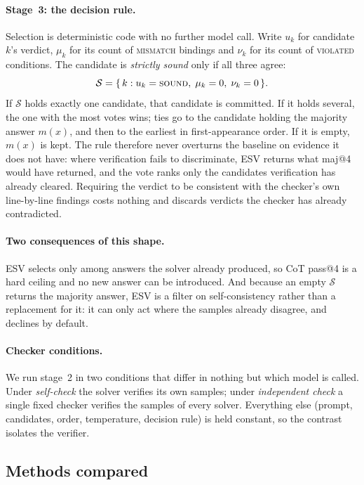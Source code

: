 \documentclass[letterpaper]{article} %
\newcommand{\method}{\textsc{ESV}}   %
\begin{document}
\paragraph{Stage~3: the decision rule.}
Selection is deterministic code with no further model call. Write $u_k$ for
candidate $k$'s verdict, $\mu_k$ for its count of \textsc{mismatch} bindings
and $\nu_k$ for its count of \textsc{violated} conditions. The candidate is
\emph{strictly sound} only if all three agree:
\begin{equation}
  \mathcal{S} = \{\, k : u_k = \textsc{sound},\; \mu_k = 0,\; \nu_k = 0 \,\}.
  \label{eq:strict}
\end{equation}
If $\mathcal{S}$ holds exactly one candidate, that candidate is committed. If it
holds several, the one with the most votes wins; ties go to the candidate
holding the majority answer $m(x)$, and then to the earliest in first-appearance
order. If it is empty, $m(x)$ is kept. The rule therefore never overturns the
baseline on evidence it does not have: where verification fails to discriminate,
\method{} returns what maj@4 would have returned, and the vote ranks only the
candidates verification has already cleared. Requiring the verdict to be
consistent with the checker's own line-by-line findings costs nothing and
discards verdicts the checker has already contradicted.

\paragraph{Two consequences of this shape.}
\method{} selects only among answers the solver already produced, so CoT pass@4
is a hard ceiling and no new answer can be introduced. And because an empty
$\mathcal{S}$ returns the majority answer, \method{} is a filter on
self-consistency rather than a replacement for it: it can only act where the
samples already disagree, and declines by default.

\paragraph{Checker conditions.}
We run stage~2 in two conditions that differ in nothing but which model is
called. Under \emph{self-check} the solver verifies its own samples; under
\emph{independent check} a single fixed checker verifies the samples of every
solver. Everything else (prompt, candidates, order, temperature, decision
rule) is held constant, so the contrast isolates the verifier.

\subsection{Methods compared}
\label{sec:comparisons}
\end{document}
